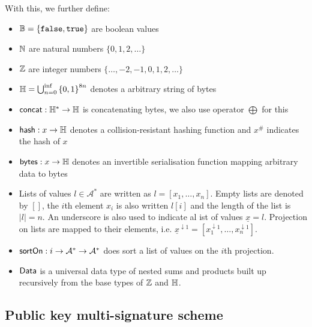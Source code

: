 \noindent With this, we further define:
\begin{itemize}
  \item $\mathbb{B} = \{\mathtt{false}, \mathtt{true}\}$ are boolean values
  \item $\mathbb{N}$ are natural numbers $\{0, 1, 2, \ldots\}$
  \item $\mathbb{Z}$ are integer numbers $\{\ldots, −2, −1, 0, 1, 2, \ldots\}$
  \item $\mathbb{H} = \bigcup_{n=0}^{\inf}{\{0,1\}}^{8n}$ denotes a arbitrary
        string of bytes
  \item $\mathsf{concat} : \mathbb{H}^* \to \mathbb{H}$ is concatenating bytes, we also use operator $\bigoplus$ for this
  \item $\mathsf{hash} : x \to \mathbb{H}$ denotes a collision-resistant
        hashing function and $x^{\#}$ indicates the hash of $x$ 
  \item $\mathsf{bytes} : x \to \mathbb{H}$ denotes an invertible serialisation function
        mapping arbitrary data to bytes
  \item Lists of values $l \in \mathcal{A}^{*}$ are written as
        $l = [x_{1}, \ldots, x_{n}]$. Empty lists are denoted by $[]$, the $i$th
        element $x_{i}$ is also written $l[i]$ and the length of the list is
        $|l| = n$. An underscore is also used to indicate al ist of values
        $\underline{x} = l$. Projection on lists are mapped to their elements,
        i.e.
        $\underline{x}^{\downarrow1} = [x_{1}^{\downarrow1}, \dots, x_{n}^{\downarrow1}]$.
  \item $\mathsf{sortOn} : i \to \mathcal{A}^{*} \to \mathcal{A}^{*}$ does sort a list of
        values on the $i$th projection.
  \item $\mathsf{Data}$ is a universal data type of nested sums and products built up
        recursively from the base types of $\mathbb{Z}$ and $\mathbb{H}$.
\end{itemize}

\subsection{Public key multi-signature scheme}\label{sec:multisig}

